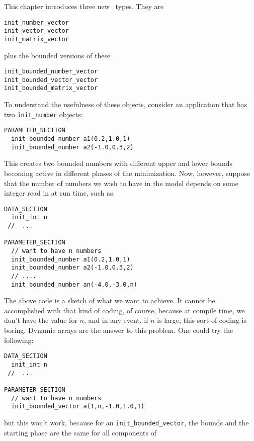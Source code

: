 %
%

This chapter introduces three new \ADM\ types. They are
\begin{lstlisting}
init_number_vector
init_vector_vector 
init_matrix_vector
\end{lstlisting}
plus the bounded versions of these
\begin{lstlisting}
init_bounded_number_vector
init_bounded_vector_vector 
init_bounded_matrix_vector
\end{lstlisting}
To understand the usefulness of these objects, consider an application
that has two \texttt{init\_number} objects:
\begin{lstlisting}
PARAMETER_SECTION
  init_bounded_number a1(0.2,1.0,1)
  init_bounded_number a2(-1.0,0.3,2)
\end{lstlisting} 
This creates two bounded numbers with different
upper and lower bounds becoming active in different phases
of the minimization.
Now, however, suppose that the number of numbers we wish to
have in the model depends on some integer read in at run time, such as:
\begin{lstlisting}
DATA_SECTION
  init_int n
 //  ...

PARAMETER_SECTION
  // want to have n numbers
  init_bounded_number a1(0.2,1.0,1)
  init_bounded_number a2(-1.0,0.3,2)
  // ....
  init_bounded_number an(-4.0,-3.0,n)
\end{lstlisting} 
The above code is a sketch of what we want to 
achieve. It cannot be accomplished with that kind of coding,
of course, because at compile time, we don't have the value for $n$,
and in any event, if $n$ is large, this sort of coding is boring.
Dynamic arrays are the answer to this problem. One could try
the following:
\begin{lstlisting}
DATA_SECTION
  init_int n
 //  ...

PARAMETER_SECTION
  // want to have n numbers
  init_bounded_vector a(1,n,-1.0,1.0,1)
\end{lstlisting} 
but this won't work, because for an \texttt{init\_bounded\_vector},
the bounds and the starting phase are the same for all components of
